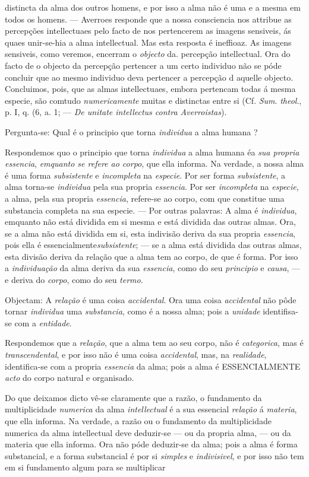 distincta da alma dos outros homens, e por isso a alma não é uma e a mesma em todos os homens. --- Averroes responde que a nossa consciencia nos attribue as percepções intellectuaes pelo facto de nos pertencerem as imagens sensiveis, ás quaes unir-se-hia a alma intellectual. Mas esta resposta é ineffioaz. As imagens sensiveis, como veremos, encerram o \emph{objecto} da. percepção intellectual. Ora do facto de o objecto da percepção pertencer a um certo individuo não se póde concluir que ao mesmo individuo deva pertencer a percepção d aquelle objecto. Concluimos, pois, que as almas intellectuaes, embora pertencam todas á mesma especie, são comtudo \emph{numericamente} muitas e distinctas entre si (Cf. \emph{Sum}. \emph{theol}., p. I, q. (6, a. 1; --- \emph{De unitate intellectus contra Averroistas}).\par *\par Pergunta-se: Qual é o principio que torna \emph{individua} a alma humana ?\par Respondemos quo o principio que torna \emph{individua} a alma humana éa \emph{sua propria essencia}, \emph{emquanto se refere ao corpo}, que ella informa. Na verdade, a nossa alma é uma forma \emph{subsistente} e \emph{incompleta} na \emph{especie}. Por ser forma \emph{subsistente}, a alma torna-se \emph{individua} pela sua propria \emph{essencia}. Por ser \emph{incompleta} na \emph{especie}, a alma, pela sua propria \emph{essencia}, refere-se ao corpo, com que constitue uma substancia completa na sua especie. --- Por outras palavras: A alma é \emph{individua}, emquanto não está dividida em si mesma e está dividida das outras almas. Ora, se a alma não está dividida em si, esta indivisão deriva da sua propria \emph{essencia}, pois ella é essencialmente\emph{subsistente}; --- se a alma está dividida das outras almas, esta divisão deriva da relação que a alma tem ao corpo, de que é forma. Por isso a \emph{individuação} da alma deriva da sua \emph{essencia}, como do seu \emph{principio} e \emph{causa}, --- e deriva do \emph{corpo}, como do seu \emph{termo}.\par Objectam: A \emph{relação} é uma coisa \emph{accidental}. Ora uma coisa \emph{accidental} não pôde tornar \emph{individua} uma \emph{substancia}, como é a nossa alma; pois a \emph{unidade} identifisa-se com a \emph{entidade}.\par Respondemos que a \emph{relação}, que a alma tem ao seu corpo, não é \emph{categorica}, mas é \emph{transcendental}, e por isso não é uma coisa \emph{accidental}, mas, na \emph{realidade}, identifica-se com a propria \emph{essencia} da alma; pois a alma é ESSENCIALMENTE \emph{acto} do corpo natural e organisado.\par Do que deixamos dicto vê-se claramente que a razão, o fundamento da multiplicidade \emph{numerica} da alma \emph{intellectual} é a sua essencial \emph{relação} á \emph{materia}, que ella informa. Na verdade, a razão ou o fundamento da multiplicidade numerica da alma intellectual deve deduzir-se --- ou da propria alma, --- ou da materia que ella informa. Ora não póde deduzir-se da alma; pois a alma é forma substancial, e a forma substancial é por si \emph{simples} e \emph{indivisivel}, e por isso não tem em si fundamento algum para se multiplicar 